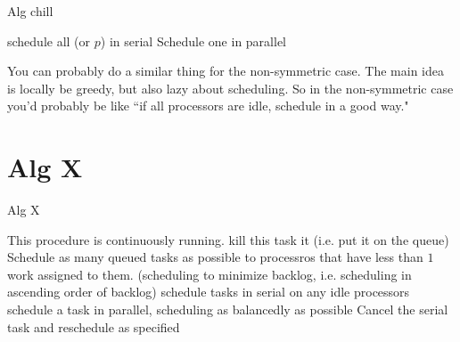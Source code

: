 \documentclass{article}[11pt]
\begin{document}
\begin{algorithm}
  \caption{Alg chill}
  \begin{algorithmic}[1]
          \State schedule all (or $p$) in serial
        \Else
          \State Schedule one in parallel
        \EndIf
      \EndIf
    \EndWhile
    \EndProcedure
  \end{algorithmic}
\end{algorithm}

You can probably do a similar thing for the non-symmetric case.
The main idea is locally be greedy, but also lazy about
scheduling.
So in the non-symmetric case you'd probably be like ``if all
processors are idle, schedule in a good way."


\section{Alg X}

\begin{algorithm}
  \caption{Alg X}
  \label{alg:nonharmfultermination}
  \begin{algorithmic}[1]
    \State This procedure is continuously running.
          \State kill this task it (i.e. put it on the queue)
        \EndIf
      \EndFor
      \State Schedule as many queued tasks as possible to
      processros that have less than $1$ work assigned to them.
      (scheduling to minimize backlog, i.e. scheduling in
      ascending order of backlog)
    \EndIf
          \State schedule tasks in serial on any idle processors
        \EndIf
          \State schedule a task in parallel, scheduling as
          balancedly as possible
        \EndIf
      \EndIf
        \State Cancel the serial task and reschedule as specified
      \EndIf
    \EndIf
    \EndProcedure
  \end{algorithmic}
\end{algorithm}
\end{document}
